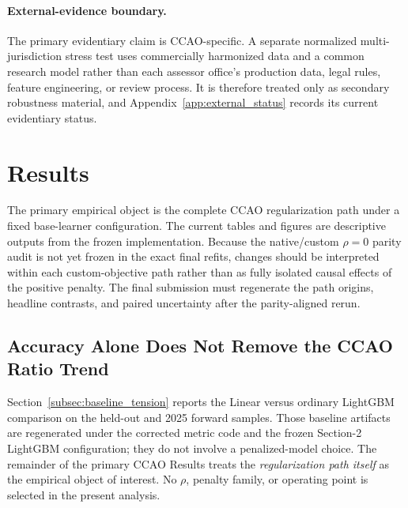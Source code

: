 \documentclass[10pt]{article}
\theoremstyle{definition}
\newcommand{\1}{\mathbf{1}}
\begin{document}
\paragraph{External-evidence boundary.}
The primary evidentiary claim is CCAO-specific. A separate normalized multi-jurisdiction stress test uses commercially harmonized data and a common research model rather than each assessor office's production data, legal rules, feature engineering, or review process. It is therefore treated only as secondary robustness material, and Appendix~\ref{app:external_status} records its current evidentiary status.

\section{Results}
\label{sec:results}

The primary empirical object is the complete CCAO regularization path under a fixed base-learner configuration. The current tables and figures are descriptive outputs from the frozen implementation. Because the native/custom $\rho=0$ parity audit is not yet frozen in the exact final refits, changes should be interpreted within each custom-objective path rather than as fully isolated causal effects of the positive penalty. The final submission must regenerate the path origins, headline contrasts, and paired uncertainty after the parity-aligned rerun.

\subsection{Accuracy Alone Does Not Remove the CCAO Ratio Trend}
\label{subsec:ccao_baseline_results}

Section~\ref{subsec:baseline_tension} reports the Linear versus ordinary LightGBM
comparison on the held-out and 2025 forward samples. Those baseline artifacts are
regenerated under the corrected metric code and the frozen Section-2 LightGBM
configuration; they do not involve a penalized-model choice. The remainder of the
primary CCAO Results treats the \emph{regularization path itself} as the empirical
object of interest. No $\rho$, penalty family, or operating point is selected in the
present analysis.
\end{document}
